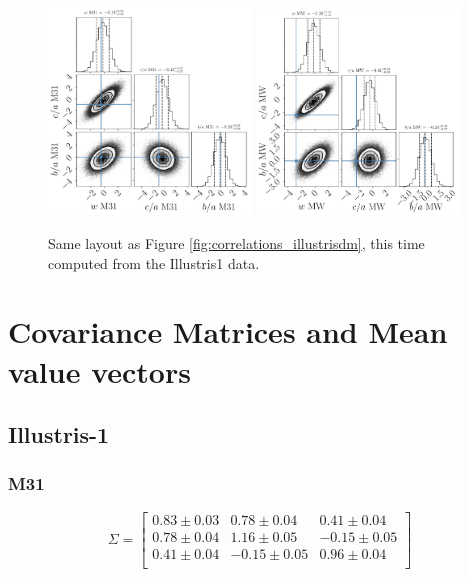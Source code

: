 \documentclass[a4paper,fleqn,usenatbib]{mnras}
\begin{document}
\begin{figure}
\centering
\includegraphics[width=0.48\textwidth]{gaussian_model_illustris_M31.pdf}
\includegraphics[width=0.48\textwidth]{gaussian_model_illustris_MW.pdf}
\caption{
Same layout as Figure \ref{fig:correlations_illustrisdm}, this time
computed from the Illustris1 data.
\label{fig:correlations_illustris}}
\end{figure}


\newpage
\newpage
\section{Covariance Matrices and Mean value vectors}
\subsection{Illustris-1}

\subsubsection{M31}

\[
\Sigma= 
\begin{bmatrix}
0.83\pm 0.03  & 0.78\pm 0.04  & 0.41\pm 0.04\\
0.78\pm 0.04  & 1.16\pm 0.05 & -0.15\pm 0.05\\
0.41\pm 0.04 & -0.15\pm 0.05 & 0.96\pm 0.04\\
\end{bmatrix}
\]
\end{document}
